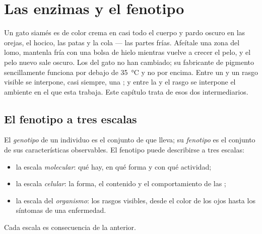 \chapter{Las enzimas y el fenotipo}\label{ch:g11:enzymes-and-phenotype}

Un gato siamés es de color crema en casi todo el cuerpo y pardo oscuro
en las orejas, el hocico, las patas y la cola --- las partes frías.
Afeítale una zona del lomo, mantenla fría con una bolsa de hielo
mientras vuelve a crecer el pelo, y el pelo nuevo sale oscuro. Los
 del gato no han cambiado; su  fabricante de pigmento
sencillamente funciona por debajo de \qty{35}{\celsius} y no por
encima. Entre un  y un rasgo visible se interpone, casi siempre, una
; y entre la  y el rasgo se interpone el ambiente en el que
esta trabaja. Este capítulo trata de esos dos intermediarios.

\section{El fenotipo a tres escalas}

\begin{definition}\label{def:g11:enzymes-and-phenotype:phenotype}
El \emph{genotipo} de un individuo es el conjunto de
 que lleva; su \emph{fenotipo} es el conjunto de
sus características observables. El fenotipo puede describirse a tres
escalas:
\begin{itemize}
  \item la escala \emph{molecular}: qué  hay, en qué forma y
        con qué actividad;
  \item la escala \emph{celular}: la forma, el contenido y el
        comportamiento de las ;
  \item la escala del \emph{organismo}: los rasgos visibles, desde el
        color de los ojos hasta los síntomas de una enfermedad.
\end{itemize}
Cada escala es consecuencia de la anterior.
\end{definition}

